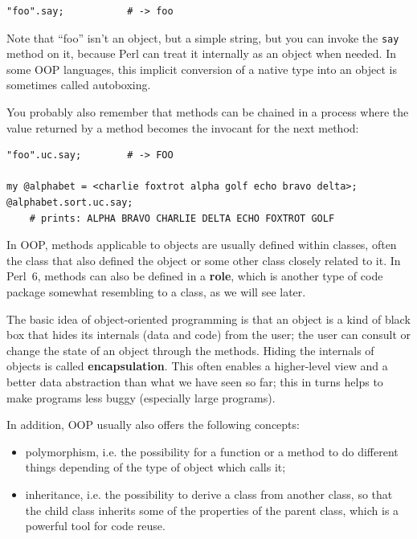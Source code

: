\begin{verbatim}
"foo".say;           # -> foo
\end{verbatim}

Note that ``foo'' isn't an object, but a simple string, but 
you can invoke the \verb'say' method on it, because Perl 
can treat it internally as an object when needed. In some 
OOP languages, this implicit conversion of a native type 
into an object is sometimes called autoboxing.

You probably also remember that methods can be chained in a 
process where the value returned by a method becomes the 
invocant for the next method:

\begin{verbatim}
"foo".uc.say;        # -> FOO

my @alphabet = <charlie foxtrot alpha golf echo bravo delta>;
@alphabet.sort.uc.say;
    # prints: ALPHA BRAVO CHARLIE DELTA ECHO FOXTROT GOLF 
\end{verbatim}

In OOP, methods applicable to objects are usually defined 
within classes, often the class that also defined the 
object or some other class closely related to it. In Perl~6, 
methods can also be defined in a {\bf role}, which is 
another type of code package somewhat resembling to a class, 
as we will see later.

The basic idea of object-oriented programming is that an 
object is a kind of black box that hides its internals
(data and code) from the user; the user can consult or change 
the state of an object through the methods. Hiding the 
internals of objects is called {\bf encapsulation}. This 
often enables a higher-level view and a better data 
abstraction than what we have seen so far; this in turns 
helps to make programs less buggy (especially large programs).

In addition, OOP usually also offers the following concepts:
\begin{itemize}
\item polymorphism, i.e. the possibility for a function or 
a method to do different things depending of the type of 
object which calls it;
\item inheritance, i.e. the possibility to derive a class from 
another class, so that the child class inherits some of 
the properties of the parent class, which is a powerful tool 
for code reuse.
\end{itemize}

